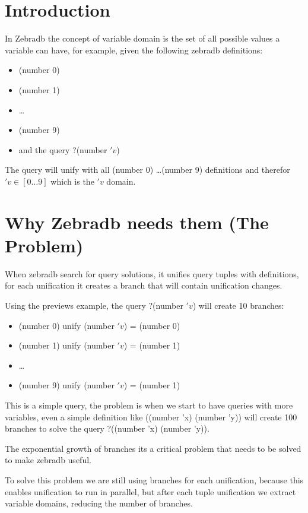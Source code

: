 \documentclass{article}
\begin{document}
\section{Introduction}

In Zebradb the concept of variable domain is the set of all possible values a variable can have,
for example, given the following zebradb definitions:

\begin{itemize}
      \item (number 0)
      \item (number 1)
      \item \ldots
      \item (number 9)
      \item and the query ?(number $'v$)
\end{itemize}

The query will unify with all (number 0) \ldots (number 9) definitions and therefor $'v \in [0 \ldots 9]$ which is the $'v$ domain.

\section{Why Zebradb needs them (The Problem)}

When zebradb search for query solutions, it unifies query tuples with definitions, for each unification it creates a branch that 
will contain unification changes.

Using the previews example, the query ?(number $'v$) will create 10 branches:

\begin{itemize}
      \item (number 0) unify (number $'v$) = (number 0)  
      \item (number 1) unify (number $'v$) = (number 1)
      \item \ldots
      \item (number 9) unify (number $'v$) = (number 1)
\end{itemize}

This is a simple query, the problem is when we start to have queries with more variables, even a simple definition like 
((number 'x) (number 'y)) will create 100 branches to solve the query ?((number 'x) (number 'y)).

The exponential growth of branches its a critical problem that needs to be solved to make zebradb useful.

To solve this problem we are still using branches for each unification, because this enables unification to run in 
parallel, but after each tuple unification we extract variable domains, reducing the number of branches. 
\end{document}
